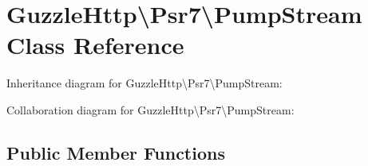 \hypertarget{classGuzzleHttp_1_1Psr7_1_1PumpStream}{}\section{Guzzle\+Http\textbackslash{}Psr7\textbackslash{}Pump\+Stream Class Reference}
\label{classGuzzleHttp_1_1Psr7_1_1PumpStream}


Inheritance diagram for Guzzle\+Http\textbackslash{}Psr7\textbackslash{}Pump\+Stream\+:


Collaboration diagram for Guzzle\+Http\textbackslash{}Psr7\textbackslash{}Pump\+Stream\+:
\subsection*{Public Member Functions}
